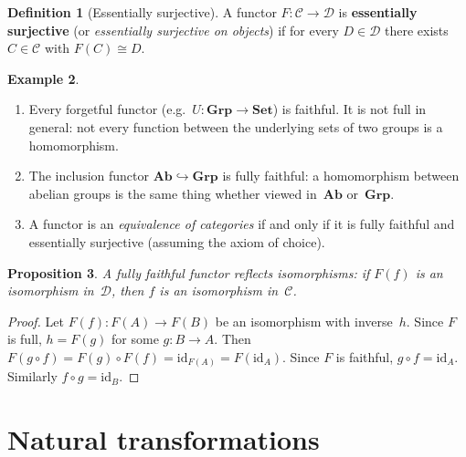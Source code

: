 \documentclass[a4paper,12pt]{book}
\newcommand{\Set}{\mathbf{Set}}
\newcommand{\Grp}{\mathbf{Grp}}
\newcommand{\Ab}{\mathbf{Ab}}
\newcommand{\id}{\mathrm{id}}
\theoremstyle{definition}
\newtheorem{definition}{Definition}[section]
\newtheorem{example}[definition]{Example}
\theoremstyle{plain}
\newtheorem{proposition}[definition]{Proposition}
\theoremstyle{remark}
\begin{document}
\begin{definition}[Essentially surjective]\label{def:ess-surj}
A functor $F\colon\mathcal{C}\to\mathcal{D}$ is
\textbf{essentially surjective} (or \emph{essentially surjective on
objects}) if for every $D\in\mathcal{D}$ there exists $C\in\mathcal{C}$
with $F(C)\cong D$.
\end{definition}

\begin{example}\label{ex:faithful-full-examples}
\begin{enumerate}[label=(\roman*)]
    \item Every forgetful functor (e.g.\ $U\colon\Grp\to\Set$) is
          faithful.  It is not full in general: not every function
          between the underlying sets of two groups is a homomorphism.
    \item The inclusion functor $\Ab\hookrightarrow\Grp$ is fully
          faithful: a homomorphism between abelian groups is the same
          thing whether viewed in~$\Ab$ or~$\Grp$.
    \item A functor is an \emph{equivalence of categories}
          if and only if it is fully faithful and essentially surjective
          (assuming the axiom of choice).
\end{enumerate}
\end{example}

\begin{proposition}\label{prop:ff-reflects-iso}
A fully faithful functor reflects isomorphisms: if
$F(f)$ is an isomorphism in~$\mathcal{D}$, then $f$ is an isomorphism
in~$\mathcal{C}$.
\end{proposition}

\begin{proof}
Let $F(f)\colon F(A)\to F(B)$ be an isomorphism with inverse~$h$.
Since $F$ is full, $h = F(g)$ for some $g\colon B\to A$.
Then $F(g\circ f) = F(g)\circ F(f) = \id_{F(A)} = F(\id_A)$.
Since $F$ is faithful, $g\circ f = \id_A$.  Similarly
$f\circ g = \id_B$.
\end{proof}


\section{Natural transformations}\label{sec:nat-trans}
\end{document}
